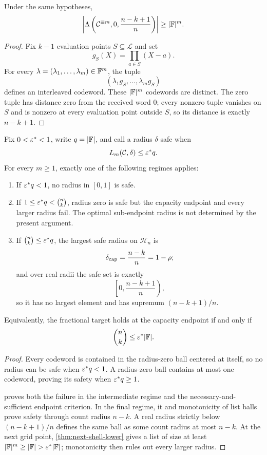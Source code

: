 \begin{theorem}
\label{thm:next-shell-lower}
Under the same hypotheses,
\[
  \left|
    \Lambda\left(
      \mathcal C^{\equiv m},
      0,
      \frac{n-k+1}{n}
    \right)
  \right|
  \ge |\mathbb{F}|^m .
\]
\end{theorem}

\begin{proof}
Fix \(k-1\) evaluation points \(S\subseteq\mathcal L\) and set
\[
  g_S(X)=\prod_{a\in S}(X-a).
\]
For every \(\lambda=(\lambda_1,\ldots,\lambda_m)\in\mathbb{F}^m\), the tuple
\[
  (\lambda_1g_S,\ldots,\lambda_mg_S)
\]
defines an interleaved codeword.  These \(|\mathbb{F}|^m\) codewords are distinct.
The zero tuple has distance zero from the received word \(0\); every nonzero
tuple vanishes on \(S\) and is nonzero at every evaluation point outside
\(S\), so its distance is exactly \(n-k+1\).
\end{proof}

\begin{theorem}
\label{thm:fractional-phase-split}
Fix \(0<\varepsilon^\ast<1\), write \(q=|\mathbb{F}|\), and call a radius \(\delta\)
safe when
\[
  L_m(\mathcal C,\delta)\le\varepsilon^\ast q.
\]
For every \(m\ge1\), exactly one of the following regimes applies:
\begin{enumerate}[label=(\roman*)]
  \item If \(\varepsilon^\ast q<1\), no radius in \([0,1]\) is safe.
  \item If
    \(1\le\varepsilon^\ast q<\binom nk\), radius zero is safe but the capacity
    endpoint and every larger radius fail.  The optimal sub-endpoint radius is
    not determined by the present argument.
  \item If \(\binom nk\le\varepsilon^\ast q\), the largest safe radius on
    \(\mathcal H_n\) is
    \[
      \delta_{\mathrm{cap}}=\frac{n-k}{n}=1-\rho;
    \]
    and over real radii the safe set is exactly
    \[
      \left[0,\frac{n-k+1}{n}\right),
    \]
    so it has no largest element and has supremum
    \((n-k+1)/n\).
 \end{enumerate}
Equivalently, the fractional target holds at the capacity endpoint if and
only if
\[
  \binom nk\le\varepsilon^\ast|\mathbb{F}|.
\]
\end{theorem}

\begin{proof}
Every codeword is contained in the radius-zero ball centered at itself, so no
radius can be safe when \(\varepsilon^\ast q<1\).  A radius-zero ball contains at most
one codeword, proving its safety when \(\varepsilon^\ast q\ge1\).

 proves both the failure in the intermediate
regime and the necessary-and-sufficient endpoint criterion.  In the final
regime, it and monotonicity of list balls prove safety through count radius
\(n-k\).  A real radius strictly below
\((n-k+1)/n\) defines the same ball as some count radius at most \(n-k\).
At the next grid point, \cref{thm:next-shell-lower} gives a list of size at
least \(|\F|^m\ge|\F|>\epsstar|\F|\); monotonicity then rules out every
larger radius.
\end{proof}

